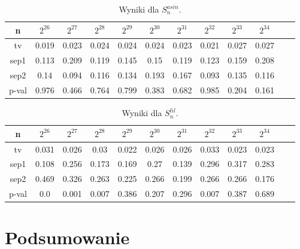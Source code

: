 \documentclass[a4paper,11pt,twoside]{book}
\newcommand{\Slil}[1]{S^{lil}_#1}
\newcommand{\Sasin}[1]{S^{asin}_#1}
\theoremstyle{definition}
\begin{document}
\begin{table}[ht!]
\centering
 \caption{Wyniki dla $\Sasin{n}$.}
 \label{tab:cmrg_asin}
\begin{tabular} {||c|c|c|c|c|c|c|c|c|c|c|c||}  
 \hline
     n &  $2^{26}$ &  $2^{27}$ &  $2^{28}$ &  $2^{29}$ &  $2^{30}$ &  $2^{31}$ &  $2^{32}$ &  $2^{33}$ &  $2^{34}$\\ \hline
    tv &  0.019 &  0.023 &  0.024 &  0.024 &  0.024 &  0.023 &  0.021 &  0.027 &  0.027\\ \hline
  sep1 &  0.113 &  0.209 &  0.119 &  0.145 &   0.15 &  0.119 &  0.123 &  0.159 &  0.208\\ \hline
  sep2 &   0.14 &  0.094 &  0.116 &  0.134 &  0.193 &  0.167 &  0.093 &  0.135 &  0.116\\ \hline
 p-val &  0.976 &  0.466 &  0.764 &  0.799 &  0.383 &  0.682 &  0.985 &  0.204 &  0.161\\ \hline


 
\end{tabular}  
\end{table}
\begin{table}[ht!]
\centering
 \caption{Wyniki dla $\Slil{n}$.}
 \label{tab:cmrg_lil}
\begin{tabular} {||c|c|c|c|c|c|c|c|c|c|c|c||}  
 \hline 
     n &  $2^{26}$ &  $2^{27}$ &  $2^{28}$ &  $2^{29}$ &  $2^{30}$ &  $2^{31}$ &  $2^{32}$ &  $2^{33}$ &  $2^{34}$\\ \hline
    tv &  0.031 &  0.026 &   0.03 &  0.022 &  0.026 &  0.026 &  0.033 &  0.023 &  0.023\\ \hline
  sep1 &  0.108 &  0.256 &  0.173 &  0.169 &   0.27 &  0.139 &  0.296 &  0.317 &  0.283\\ \hline
  sep2 &  0.469 &  0.326 &  0.263 &  0.225 &  0.266 &  0.199 &  0.266 &  0.266 &  0.176\\ \hline
 p-val &    0.0 &  0.001 &  0.007 &  0.386 &  0.207 &  0.296 &  0.007 &  0.387 &  0.689\\ \hline

 
\end{tabular}  
\end{table}
\FloatBarrier
\section{Podsumowanie}
\end{document}
